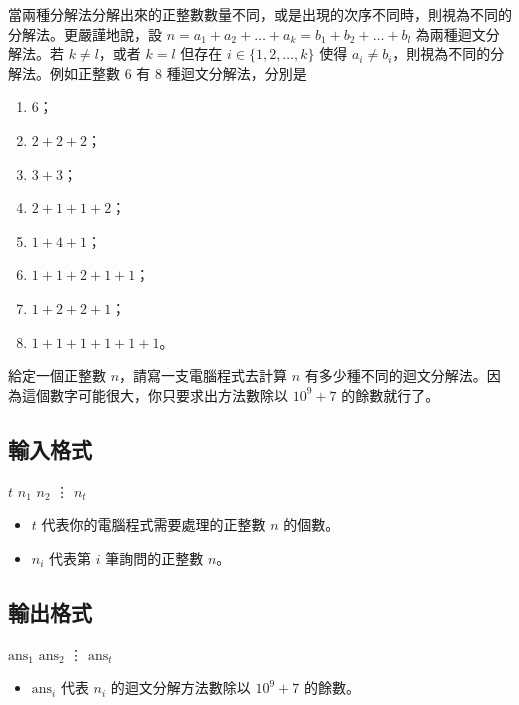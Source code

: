 當兩種分解法分解出來的正整數數量不同，或是出現的次序不同時，則視為不同的分解法。更嚴謹地說，設
\(n = a_1 + a_2 + \ldots + a_k = b_1 + b_2 + \ldots + b_l\)
為兩種迴文分解法。若 \(k \ne l\)，或者 \(k = l\) 但存在
\(i \in \{1, 2, \ldots, k\}\) 使得
\(a_i \ne b_i\)，則視為不同的分解法。例如正整數 \(6\) 有 \(8\)
種迴文分解法，分別是

\begin{enumerate}
\def\labelenumi{\arabic{enumi}.}
\tightlist
\item
  \(6\)；
\item
  \(2 + 2 + 2\)；
\item
  \(3 + 3\)；
\item
  \(2 + 1 + 1 + 2\)；
\item
  \(1 + 4 + 1\)；
\item
  \(1 + 1 + 2 + 1 + 1\)；
\item
  \(1 + 2 + 2 + 1\)；
\item
  \(1 + 1 + 1 + 1 + 1 + 1\)。
\end{enumerate}

給定一個正整數 \(n\)，請寫一支電腦程式去計算 \(n\)
有多少種不同的迴文分解法。因為這個數字可能很大，你只要求出方法數除以
\(10^9 + 7\) 的餘數就行了。

\subsection{輸入格式}

\begin{format}
\f{
$t$
$n_1$
$n_2$
\vdots
$n_t$
}
\end{format}

\begin{itemize}
\tightlist
\item
  \(t\) 代表你的電腦程式需要處理的正整數 \(n\) 的個數。
\item
  \(n_i\) 代表第 \(i\) 筆詢問的正整數 \(n\)。
\end{itemize}

\subsection{輸出格式}

\begin{format}
\f{
$\textrm{ans}_1$
$\textrm{ans}_2$
\vdots
$\textrm{ans}_t$
}
\end{format}

\begin{itemize}
\tightlist
\item
  \(\textrm{ans}_i\) 代表 \(n_i\) 的迴文分解方法數除以 \(10^9 + 7\)
  的餘數。
\end{itemize}

